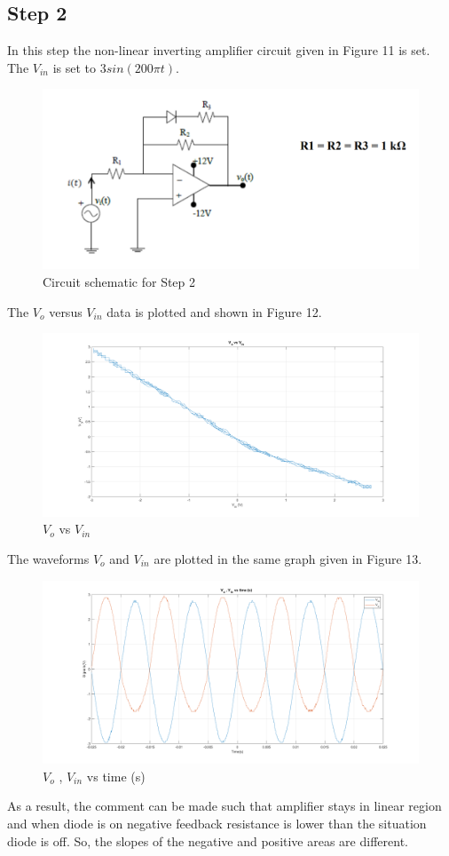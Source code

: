 \documentclass[letterpaper,12pt]{article}
\begin{document}
\subsection{Step 2}
In this step the non-linear inverting amplifier circuit given in Figure 11 is set. The \(V_{in}\) is set to \(3sin(200\pi t)\).
\begin{figure}[H]
	\centering
   \includegraphics[width=1\textwidth]{circuit_2.png}
   \caption{Circuit schematic for Step 2}
\end{figure}
The \(V_{o}\) versus \(V_{in}\) data is plotted and shown in Figure 12. 

\begin{figure}[H]
	\centering
   \includegraphics[width=1\textwidth]{2_1.png}
   \caption{\(V_{o}\) vs \(V_{in}\)}
\end{figure}
The waveforms \(V_{o}\) and \(V_{in}\) are plotted in the same graph given in Figure 13.
\begin{figure}[H]
	\centering
   \includegraphics[width=1\textwidth]{2_2.png}
   \caption{\(V_{o}\) , \(V_{in}\) vs time (s) }
\end{figure}
As a result, the comment can be made such that amplifier stays in linear region and when diode is on negative feedback resistance is lower than the situation diode is off. So, the slopes of the negative and positive areas are different.
\end{document}
